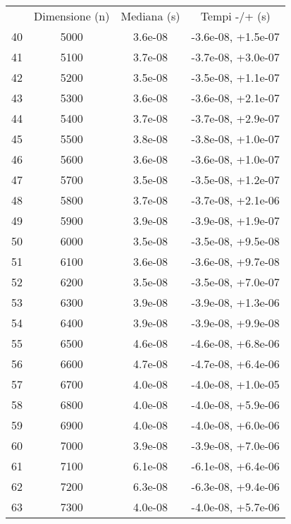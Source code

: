 \begin{table}
\centering
\begin{adjustbox}{width=1\textwidth/2}
\begin{tabular}{|c|c|c|c|}
\hline
 & Dimensione (n) & Mediana (s) & Tempi -/+ (s) \\
40 & 5000 & 3.6e-08 & -3.6e-08, +1.5e-07 \\
\cline{1-4}
41 & 5100 & 3.7e-08 & -3.7e-08, +3.0e-07 \\
\cline{1-4}
42 & 5200 & 3.5e-08 & -3.5e-08, +1.1e-07 \\
\cline{1-4}
43 & 5300 & 3.6e-08 & -3.6e-08, +2.1e-07 \\
\cline{1-4}
44 & 5400 & 3.7e-08 & -3.7e-08, +2.9e-07 \\
\cline{1-4}
45 & 5500 & 3.8e-08 & -3.8e-08, +1.0e-07 \\
\cline{1-4}
46 & 5600 & 3.6e-08 & -3.6e-08, +1.0e-07 \\
\cline{1-4}
47 & 5700 & 3.5e-08 & -3.5e-08, +1.2e-07 \\
\cline{1-4}
48 & 5800 & 3.7e-08 & -3.7e-08, +2.1e-06 \\
\cline{1-4}
49 & 5900 & 3.9e-08 & -3.9e-08, +1.9e-07 \\
\cline{1-4}
50 & 6000 & 3.5e-08 & -3.5e-08, +9.5e-08 \\
\cline{1-4}
51 & 6100 & 3.6e-08 & -3.6e-08, +9.7e-08 \\
\cline{1-4}
52 & 6200 & 3.5e-08 & -3.5e-08, +7.0e-07 \\
\cline{1-4}
53 & 6300 & 3.9e-08 & -3.9e-08, +1.3e-06 \\
\cline{1-4}
54 & 6400 & 3.9e-08 & -3.9e-08, +9.9e-08 \\
\cline{1-4}
55 & 6500 & 4.6e-08 & -4.6e-08, +6.8e-06 \\
\cline{1-4}
56 & 6600 & 4.7e-08 & -4.7e-08, +6.4e-06 \\
\cline{1-4}
57 & 6700 & 4.0e-08 & -4.0e-08, +1.0e-05 \\
\cline{1-4}
58 & 6800 & 4.0e-08 & -4.0e-08, +5.9e-06 \\
\cline{1-4}
59 & 6900 & 4.0e-08 & -4.0e-08, +6.0e-06 \\
\cline{1-4}
60 & 7000 & 3.9e-08 & -3.9e-08, +7.0e-06 \\
\cline{1-4}
61 & 7100 & 6.1e-08 & -6.1e-08, +6.4e-06 \\
\cline{1-4}
62 & 7200 & 6.3e-08 & -6.3e-08, +9.4e-06 \\
\cline{1-4}
63 & 7300 & 4.0e-08 & -4.0e-08, +5.7e-06 \\

\end{tabular}
\end{adjustbox}
\end{table}
